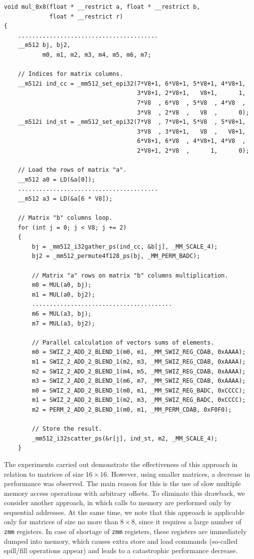 \documentclass[
11pt,%
tightenlines,%
twoside,%
onecolumn,%
nofloats,%
nobibnotes,%
nofootinbib,%
superscriptaddress,%
noshowpacs,%
centertags]%
{revtex4}
\begin{document}
\begin{lstlisting}
void mul_8x8(float * __restrict a, float * __restrict b,
             float * __restrict r)
{
    ........................................
    __m512 bj, bj2,
           m0, m1, m2, m3, m4, m5, m6, m7;

    // Indices for matrix columns.
    __m512i ind_cc = _mm512_set_epi32(7*V8+1, 6*V8+1, 5*V8+1, 4*V8+1,
                                      3*V8+1, 2*V8+1,   V8+1,      1,
                                      7*V8  , 6*V8  , 5*V8  , 4*V8  ,
                                      3*V8  , 2*V8  ,   V8  ,      0);
    __m512i ind_st = _mm512_set_epi32(7*V8  , 7*V8+1, 5*V8  , 5*V8+1,
                                      3*V8  , 3*V8+1,   V8  ,   V8+1,
                                      6*V8+1, 6*V8  , 4*V8+1, 4*V8  ,
                                      2*V8+1, 2*V8  ,      1,      0);

    // Load the rows of matrix "a".
    __m512 a0 = LD(&a[0]);
    ........................................
    __m512 a3 = LD(&a[6 * V8]);

    // Matrix "b" columns loop.
    for (int j = 0; j < V8; j += 2)
    {
        bj = _mm512_i32gather_ps(ind_cc, &b[j], _MM_SCALE_4);
        bj2 = _mm512_permute4f128_ps(bj, _MM_PERM_BADC);

        // Matrix "a" rows on matrix "b" columns multiplication.
        m0 = MUL(a0, bj);
        m1 = MUL(a0, bj2);
        ........................................
        m6 = MUL(a3, bj);
        m7 = MUL(a3, bj2);

        // Parallel calculation of vectors sums of elements.
        m0 = SWIZ_2_ADD_2_BLEND_1(m0, m1, _MM_SWIZ_REG_CDAB, 0xAAAA);
        m1 = SWIZ_2_ADD_2_BLEND_1(m2, m3, _MM_SWIZ_REG_CDAB, 0xAAAA);
        m2 = SWIZ_2_ADD_2_BLEND_1(m4, m5, _MM_SWIZ_REG_CDAB, 0xAAAA);
        m3 = SWIZ_2_ADD_2_BLEND_1(m6, m7, _MM_SWIZ_REG_CDAB, 0xAAAA);
        m0 = SWIZ_2_ADD_2_BLEND_1(m0, m1, _MM_SWIZ_REG_BADC, 0xCCCC);
        m1 = SWIZ_2_ADD_2_BLEND_1(m2, m3, _MM_SWIZ_REG_BADC, 0xCCCC);
        m2 = PERM_2_ADD_2_BLEND_1(m0, m1, _MM_PERM_CDAB, 0xF0F0);

        // Store the result.
        _mm512_i32scatter_ps(&r[j], ind_st, m2, _MM_SCALE_4);
    }
\end{lstlisting}

The experiments carried out demonstrate the effectiveness of this approach in relation to matrices of size $16 \times 16$.
However, using smaller matrices, a decrease in performance was observed.
The main reason for this is the use of slow multiple memory access operations with arbitrary offsets.
To eliminate this drawback, we consider another approach, in which calls to memory are performed only by sequential addresses.
At the same time, we note that this approach is applicable only for matrices of size no more than $8 \times 8$, since it requires a large number of \texttt{zmm} registers.
In case of shortage of \texttt{zmm} registers, these registers are immediately dumped into memory, which causes extra store and load commands (so-called spill/fill operations appear) and leads to a catastrophic performance decrease.
\end{document}
